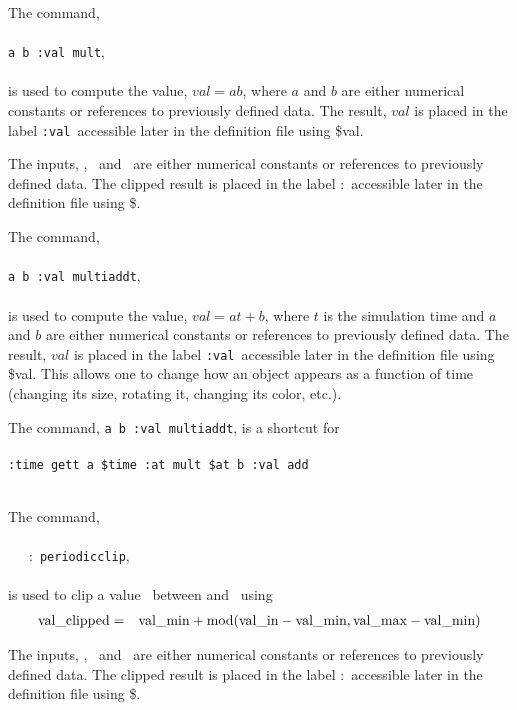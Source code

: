 \documentclass[11pt,twoside]{book}
\newcommand{\hitem}[1]{\item[{\bf #1} \hfill]}
\begin{document}
\hitem{mult}
The command, \\
\\
{\tt a b :val mult}, \\
\\
is used to compute the value, $val=ab$, where $a$ and $b$ are either
numerical constants or references to previously defined data.
The result, $val$ is placed in the label {\tt :val}\ accessible
later in the definition file using \$val.

\noindent The inputs, \valin, \valmin\ and \valmax\ are either
numerical constants or references to previously defined data.
The clipped result is placed in the label :\valclipped\ accessible
later in the definition file using \$\valclipped.

\hitem{multiaddt}
The command, \\
\\
{\tt a b :val multiaddt}, \\
\\
is used to compute the value, $val=at+b$, where $t$ is the simulation
time and $a$ and $b$ are either numerical constants or references to
previously defined data. The result, $val$ is placed in the label
{\tt :val}\ accessible later in the definition file using \$val.
This allows one to change how an object appears as a function of
time (changing its size, rotating it, changing its color, etc.).

The command, {\tt a b :val multiaddt}, is a shortcut for\\
\\
{\tt :time gett a \$time :at mult \$at b :val add}\\
\\


\hitem{periodicclip}
The command, \\
\\
\valin\ \valmin\ \valmax\ :\valclipped\ {\tt periodicclip}, \\
\\
is used to clip a value \valin\ between \valmin
and \valmax\ using
\begin{eqnarray}
{\tt \mbox{val\_clipped}}&=&{\tt \mbox{val\_min}}+\mbox{mod}( {\tt \mbox{val\_in}}-{\tt \mbox{val\_min}},{\tt \mbox{val\_max}}-{\tt \mbox{val\_min}} )\\
\end{eqnarray}

\noindent The inputs, \valin, \valmin\ and \valmax\ are either numerical
constants or references to previously defined data.  The clipped result is placed
in the label :\valclipped\ accessible later in the definition file using \$\valclipped.
\end{document}
